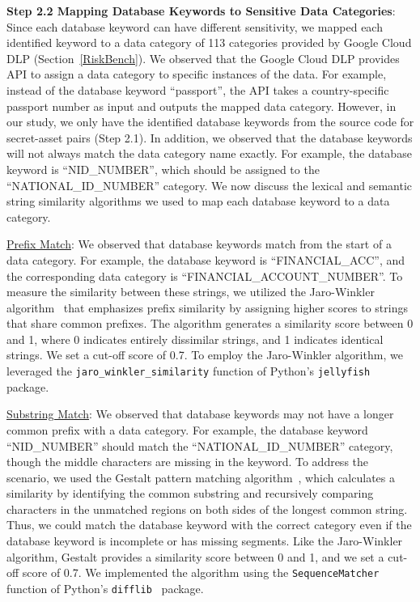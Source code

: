\textbf{Step 2.2 Mapping Database Keywords to Sensitive Data Categories}: Since each database keyword can have different sensitivity, we mapped each identified keyword to a data category of 113 categories provided by Google Cloud DLP (Section~\ref{RiskBench}). We observed that the Google Cloud DLP provides API to assign a data category to specific instances of the data. For example, instead of the database keyword ``passport'', the API takes a country-specific passport number as input and outputs the mapped data category. However, in our study, we only have the identified database keywords from the source code for secret-asset pairs (Step 2.1). In addition, we observed that the database keywords will not always match the data category name exactly. For example, the database keyword is ``NID\_NUMBER'', which should be assigned to the ``NATIONAL\_ID\_NUMBER'' category. We now discuss the lexical and semantic string similarity algorithms we used to map each database keyword to a data category.

\uline{Prefix Match}: We observed that database keywords match from the start of a data category. For example, the database keyword is ``FINANCIAL\_ACC'', and the corresponding data category is ``FINANCIAL\_ACCOUNT\_NUMBER''. To measure the similarity between these strings, we utilized the Jaro-Winkler algorithm~\cite{winkler1990string} that emphasizes prefix similarity by assigning higher scores to strings that share common prefixes. The algorithm generates a similarity score between 0 and 1, where 0 indicates entirely dissimilar strings, and 1 indicates identical strings. We set a cut-off score of 0.7. To employ the Jaro-Winkler algorithm, we leveraged the \texttt{jaro\_winkler\_similarity} function of Python's \texttt{jellyfish}~\cite{jellyfish-python} package.

\uline{Substring Match}: We observed that database keywords may not have a longer common prefix with a data category. For example, the database keyword ``NID\_NUMBER'' should match the ``NATIONAL\_ID\_NUMBER'' category, though the middle characters are missing in the keyword. To address the scenario, we used the Gestalt pattern matching algorithm~\cite{black2004ratcliff}, which calculates a similarity by identifying the common substring and recursively comparing characters in the unmatched regions on both sides of the longest common string. Thus, we could match the database keyword with the correct category even if the database keyword is incomplete or has missing segments. Like the Jaro-Winkler algorithm, Gestalt provides a similarity score between 0 and 1, and we set a cut-off score of 0.7. We implemented the algorithm using the \texttt{SequenceMatcher} function of Python's \texttt{difflib}~\cite{sequencematcher} package.


